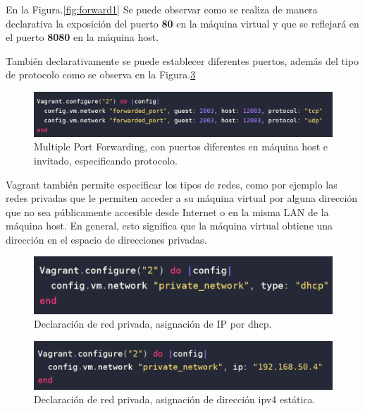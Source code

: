 \documentclass[letterpaper, 12pt, oneside]{article}
\begin{document}
    En la Figura.\ref{fig:forward1} Se puede observar como se realiza de manera declarativa la exposición del puerto \textbf{80} en la máquina virtual y que se reflejará en el puerto \textbf{8080} en la máquina host.
    
    También declarativamente se puede establecer diferentes puertos, además del tipo de protocolo como se observa en la Figura.\ref{fig:forward2}
    
    \begin{figure}[H]
        \includegraphics[scale=0.7]{img/vagrantport/portforwaded2.png}
        \caption{Multiple Port Forwarding, con puertos diferentes en máquina host e invitado, especificando protocolo.}
        \label{fig:forward2}
    \end{figure}
    Vagrant también permite especificar los tipos de redes, como por ejemplo las redes privadas que le permiten acceder a su máquina virtual por alguna dirección que no sea públicamente accesible desde Internet o en la misma LAN de la máquina host. En general, esto significa que la  máquina virtual obtiene una dirección en el espacio de direcciones privadas.
    \begin{figure}[H]
        \includegraphics[scale=1.2]{img/vagrantport/privadadhcp.png}
        \caption{Declaración de red privada, asignación de IP por dhcp.}
        \label{fig:forward2}
    \end{figure}
    
    \begin{figure}[H]
        \includegraphics[scale=1.1]{img/vagrantport/privadastatic.png}
        \caption{Declaración de red privada, asignación de dirección ipv4 estática.}
        \label{fig:forward2}
    \end{figure}
    
\end{document}
